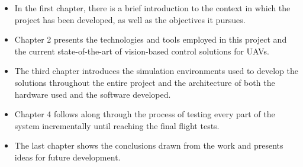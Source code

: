 \begin{itemize}
    \item In the first chapter, there is a brief introduction to the context in which the project has been developed, as well as the objectives it pursues.
    \item Chapter 2 presents the technologies and tools employed in this project and the current state-of-the-art of vision-based control solutions for UAVs.
    \item The third chapter introduces the simulation environments used to develop the solutions throughout the entire project and the architecture of both the hardware used and the software developed.
    \item Chapter 4 follows along through the process of testing every part of the system incrementally until reaching the final flight tests.
    \item The last chapter shows the conclusions drawn from the work and presents ideas for future development.
\end{itemize}


\cleardoublepage